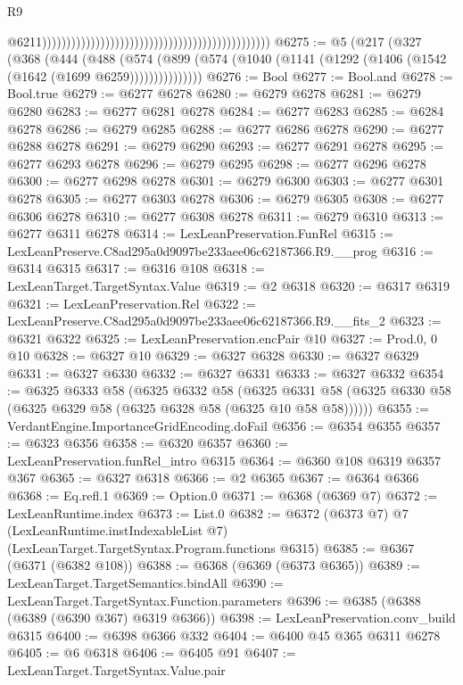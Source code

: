 \begin{lexlean}{R9}
\begin{coremodule}
                                                                                                  @6211)))))))))))))))))))))))))))))))))))))))))))))))
@6275 := @5
    (@217
      (@327
        (@368
          (@444
            (@488
              (@574
                (@899 (@574 (@1040 (@1141 (@1292 (@1406 (@1542 (@1642 (@1699 @6259)))))))))))))))
@6276 := Bool
@6277 := Bool.and
@6278 := Bool.true
@6279 := @6277 @6278
@6280 := @6279 @6278
@6281 := @6279 @6280
@6283 := @6277 @6281 @6278
@6284 := @6277 @6283
@6285 := @6284 @6278
@6286 := @6279 @6285
@6288 := @6277 @6286 @6278
@6290 := @6277 @6288 @6278
@6291 := @6279 @6290
@6293 := @6277 @6291 @6278
@6295 := @6277 @6293 @6278
@6296 := @6279 @6295
@6298 := @6277 @6296 @6278
@6300 := @6277 @6298 @6278
@6301 := @6279 @6300
@6303 := @6277 @6301 @6278
@6305 := @6277 @6303 @6278
@6306 := @6279 @6305
@6308 := @6277 @6306 @6278
@6310 := @6277 @6308 @6278
@6311 := @6279 @6310
@6313 := @6277 @6311 @6278
@6314 := LexLeanPreservation.FunRel
@6315 := LexLeanPreserve.C8ad295a0d9097be233aee06c62187366.R9.__prog
@6316 := @6314 @6315
@6317 := @6316 @108
@6318 := LexLeanTarget.TargetSyntax.Value
@6319 := @2 @6318
@6320 := @6317 @6319
@6321 := LexLeanPreservation.Rel
@6322 := LexLeanPreserve.C8ad295a0d9097be233aee06c62187366.R9.__fits_2
@6323 := @6321 @6322
@6325 := LexLeanPreservation.encPair @10
@6327 := Prod.{0, 0} @10
@6328 := @6327 @10
@6329 := @6327 @6328
@6330 := @6327 @6329
@6331 := @6327 @6330
@6332 := @6327 @6331
@6333 := @6327 @6332
@6354 := @6325
    @6333
    @58
    (@6325
      @6332
      @58
      (@6325 @6331 @58 (@6325 @6330 @58 (@6325 @6329 @58 (@6325 @6328 @58 (@6325 @10 @58 @58))))))
@6355 := VerdantEngine.ImportanceGridEncoding.doFail
@6356 := @6354 @6355
@6357 := @6323 @6356
@6358 := @6320 @6357
@6360 := LexLeanPreservation.funRel_intro @6315
@6364 := @6360 @108 @6319 @6357 @367
@6365 := @6327 @6318
@6366 := @2 @6365
@6367 := @6364 @6366
@6368 := Eq.refl.{1}
@6369 := Option.{0}
@6371 := @6368 (@6369 @7)
@6372 := LexLeanRuntime.index
@6373 := List.{0}
@6382 := @6372
    (@6373 @7)
    @7
    (LexLeanRuntime.instIndexableList @7)
    (LexLeanTarget.TargetSyntax.Program.functions @6315)
@6385 := @6367 (@6371 (@6382 @108))
@6388 := @6368 (@6369 (@6373 @6365))
@6389 := LexLeanTarget.TargetSemantics.bindAll
@6390 := LexLeanTarget.TargetSyntax.Function.parameters
@6396 := @6385 (@6388 (@6389 (@6390 @367) @6319 @6366))
@6398 := LexLeanPreservation.conv_build @6315
@6400 := @6398 @6366 @332
@6404 := @6400 @45 @365 @6311 @6278
@6405 := @6 @6318
@6406 := @6405 @91
@6407 := LexLeanTarget.TargetSyntax.Value.pair

\end{coremodule}
\end{lexlean}
